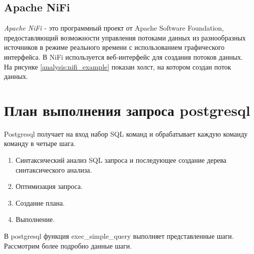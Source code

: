 \newpage

\subsection{Apache NiFi}

\textit{Apache NiFi \cite{bib4}} - это программный проект от Apache Software Foundation, %
предоставляющий возможности управления потоками 
данных из разнообразных источников в режиме реального времени с использованием графического интерфейса.
В NiFi используется веб-интерфейс для создания потоков данных.
На рисунке \ref{analysis:nifi_example} показан холст, на котором создан поток данных.

\begin{figure}[ht!]
\end{figure}

\section{План выполнения запроса postgresql}

Postgresql получает на вход набор SQL команд и обрабатывает каждую команду команду в четыре шага.

\begin{enumerate}
	\item Синтаксический анализ SQL запроса и последующее создание дерева синтаксического анализа.
	\item Оптимизация запроса.
	\item Создание плана.
	\item Выполнение.
\end{enumerate}

В postgresql функция exec\_simple\_query выполняет представленные шаги.
Рассмотрим более подробно данные шаги.

